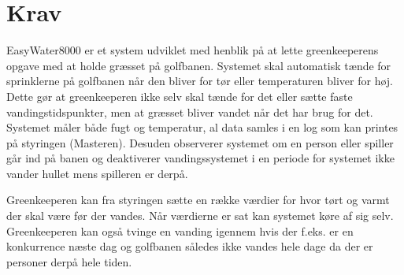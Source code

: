 \chapter{Krav}
EasyWater8000 er et system udviklet med henblik på at lette greenkeeperens opgave med at holde græsset på golfbanen. Systemet skal automatisk tænde for sprinklerne på golfbanen når den bliver for tør eller temperaturen bliver for høj. Dette gør at greenkeeperen ikke selv skal tænde for det eller sætte faste vandingstidspunkter, men at græsset bliver vandet når det har brug for det. Systemet måler både fugt og temperatur, al data samles i en log som kan printes på styringen (Masteren).  Desuden observerer systemet om en person eller spiller går ind på banen og deaktiverer vandingssystemet i en periode for systemet ikke vander hullet mens spilleren er derpå. 

Greenkeeperen kan fra styringen sætte en række værdier for hvor tørt og varmt der skal være før der vandes. Når værdierne er sat kan systemet køre af sig selv. Greenkeeperen kan også tvinge en vanding igennem hvis der f.eks. er en konkurrence næste dag og golfbanen således ikke vandes hele dage da der er personer derpå hele tiden. 